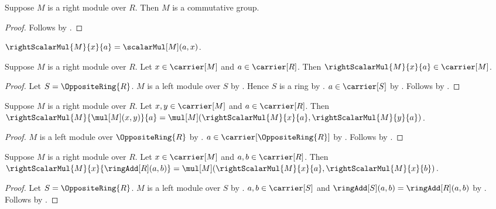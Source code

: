 \begin{corollary}\label{right_module_is_commutative_group}
    Suppose $M$ is a right module over $R$.
    Then $M$ is a commutative group.
\end{corollary}
\begin{proof}
    Follows by
        .
\end{proof}

\begin{definition}\label{right_scalar_multiplication}
    $\rightScalarMul{M}{x}{a}=\scalarMul[M](a,x)$.
\end{definition}

\begin{proposition}\label{right_scalar_type}
    Suppose $M$ is a right module over $R$.
    Let $x\in\carrier[M]$ and $a\in\carrier[R]$.
    Then $\rightScalarMul{M}{x}{a}\in\carrier[M]$.
\end{proposition}
\begin{proof}
    Let $S=\OppositeRing{R}$.
    $M$ is a left module over $S$ by
        .
    Hence $S$ is a ring by .
    $a\in\carrier[S]$ by .
    Follows by
        .
\end{proof}

\begin{proposition}\label{right_scalar_vector_distributive}
    Suppose $M$ is a right module over $R$.
    Let $x,y\in\carrier[M]$ and $a\in\carrier[R]$.
    Then
        $\rightScalarMul{M}{\mul[M](x,y)}{a}
            =\mul[M](\rightScalarMul{M}{x}{a},
                \rightScalarMul{M}{y}{a})$.
\end{proposition}
\begin{proof}
    $M$ is a left module over $\OppositeRing{R}$ by
        .
    $a\in\carrier[\OppositeRing{R}]$ by
        .
    Follows by
        .
\end{proof}

\begin{proposition}\label{right_scalar_add_distributive}
    Suppose $M$ is a right module over $R$.
    Let $x\in\carrier[M]$ and $a,b\in\carrier[R]$.
    Then
        $\rightScalarMul{M}{x}{\ringAdd[R](a,b)}
            =\mul[M](\rightScalarMul{M}{x}{a},
                \rightScalarMul{M}{x}{b})$.
\end{proposition}
\begin{proof}
    Let $S=\OppositeRing{R}$.
    $M$ is a left module over $S$ by
        .
    $a,b\in\carrier[S]$ and
        $\ringAdd[S](a,b)=\ringAdd[R](a,b)$ by
        .
    Follows by
        .
\end{proof}

